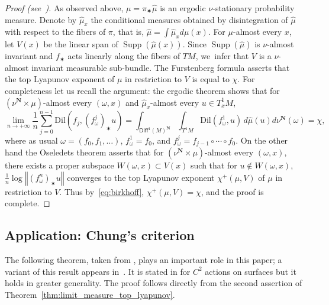 \documentclass[JEP,XML,SOM,Unicode,published]{cedram}
\newcommand{\norm}[1]{{\left\Vert#1\right\Vert}}
\newcommand{\unsur}[1]{\frac{1}{#1}}
\DeclareMathOperator{\supp}{Supp}
\def\N{\mathbf{N}}
\newcommand{\dil}{{\mathrm{Dil}}}
\newcommand\Diff{{\mathsf{Diff}}}
\theoremstyle{plain}
\theoremstyle{definition}
\begin{document}
\begin{proof}[Proof (see~\cite{chung, hurtado:burnside})]
As observed above, $\mu = \pi_\varstar \hat \mu$ is an
ergodic $\nu$-stationary probability measure. Denote by $\hat\mu_x$ the conditional measures obtained
by disintegration of $\hat\mu$ with respect to the fibers of $\pi$, that is,
$\hat\mu = \int \hat\mu_x d\mu(x)$. For $\mu$-almost every $x$, let $V(x)$ be the linear span of
$\supp(\hat \mu(x))$. Since $\supp(\hat\mu)$ is $\nu$-almost invariant and
$f_\varstar $ acts linearly along the fibers of $TM$, we~infer that $V$ is a $\nu$-almost invariant
measurable sub-bundle. The Furstenberg formula asserts that
the top Lyapunov exponent of $\mu$ in restriction
to $V$ is equal to $\chi$. For completeness let us recall the argument:
the ergodic theorem shows that for $(\nu^\N\times \mu)$-almost every $(\omega, x)$
and $\hat\mu_x$-almost every $u\in T^1_xM$,\vspace*{-3pt}
\begin{equation}\label{eq:birkhoff}
\lim_{n\to + \infty} \frac{1}{n} \sum_{j=0}^{n-1} \dil\left( f_j, (f^j_\omega)_\varstar u \right) = \int_{\Diff^1(M)^\N} \int_{T^1M} \dil(f^1_\omega, u) \, d\hat\mu( u) d\nu^{\N}(\omega) = \chi,
\end{equation}
where as usual
$\omega=(f_0, f_1, \ldots)$, $f^1_\omega=f_0$, and $f^j_\omega= f_{j-1}\circ \cdots \circ f_0$.
On the other hand the Oseledets theorem asserts that for
$(\nu^\N\times \mu)$-almost every $(\omega, x)$, there exists a proper subspace
$W(\omega, x)\subset V(x)$ such that for $u\notin W(\omega, x)$,
$\unsur{n} \log\norm{(f^n_\omega)_\varstar u}$ converges to the top Lyapunov exponent $\chi^+(\mu, V)$
of $\mu$ in restriction to $V$. Thus by~\eqref{eq:birkhoff}, $\chi^+(\mu, V)=\chi$, and the proof is complete.
\end{proof}

\subsection{Application: Chung's criterion}

The following theorem, taken from \cite[Prop.\,3.17]{chung},
plays an important role in this paper; a variant of this result appears in~\cite{brown-fisher-hurtado}.
It is stated in \cite{chung} for $C^2$ actions on surfaces but
it holds in greater generality. The proof follows directly from the second assertion of Theorem~\ref{thm:limit_measure_top_lyapunov}.\enlargethispage{\baselineskip}%
\end{document}
